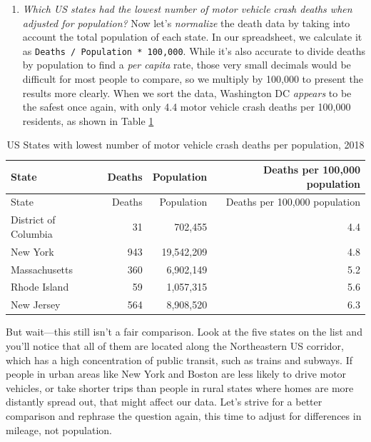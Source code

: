 \documentclass[
  english,
]{book}
\providecommand{\tightlist}{%
  \setlength{\itemsep}{0pt}\setlength{\parskip}{0pt}}
\begin{document}
\begin{enumerate}
\def\labelenumi{\arabic{enumi}.}
\setcounter{enumi}{1}
\tightlist
\item
  \emph{Which US states had the lowest number of motor vehicle crash deaths when adjusted for population?} Now let's \emph{normalize} the death data by taking into account the total population of each state. In our spreadsheet, we calculate it as \texttt{Deaths\ /\ Population\ *\ 100,000}. While it's also accurate to divide deaths by population to find a \emph{per capita} rate, those very small decimals would be difficult for most people to compare, so we multiply by 100,000 to present the results more clearly. When we sort the data, Washington DC \emph{appears} to be the safest once again, with only 4.4 motor vehicle crash deaths per 100,000 residents, as shown in Table \ref{tab:deaths-population}
\end{enumerate}

\begin{longtable}[]{@{}lrrr@{}}
\caption{\label{tab:deaths-population} US States with lowest number of motor vehicle crash deaths per population, 2018}\tabularnewline
\toprule
State & Deaths & Population & Deaths per 100,000 population \\
\midrule
\endfirsthead
\toprule
State & Deaths & Population & Deaths per 100,000 population \\
\midrule
\endhead
District of Columbia & 31 & 702,455 & 4.4 \\
New York & 943 & 19,542,209 & 4.8 \\
Massachusetts & 360 & 6,902,149 & 5.2 \\
Rhode Island & 59 & 1,057,315 & 5.6 \\
New Jersey & 564 & 8,908,520 & 6.3 \\
\bottomrule
\end{longtable}

But wait---this still isn't a fair comparison. Look at the five states on the list and you'll notice that all of them are located along the Northeastern US corridor, which has a high concentration of public transit, such as trains and subways. If people in urban areas like New York and Boston are less likely to drive motor vehicles, or take shorter trips than people in rural states where homes are more distantly spread out, that might affect our data. Let's strive for a better comparison and rephrase the question again, this time to adjust for differences in mileage, not population.
\end{document}

